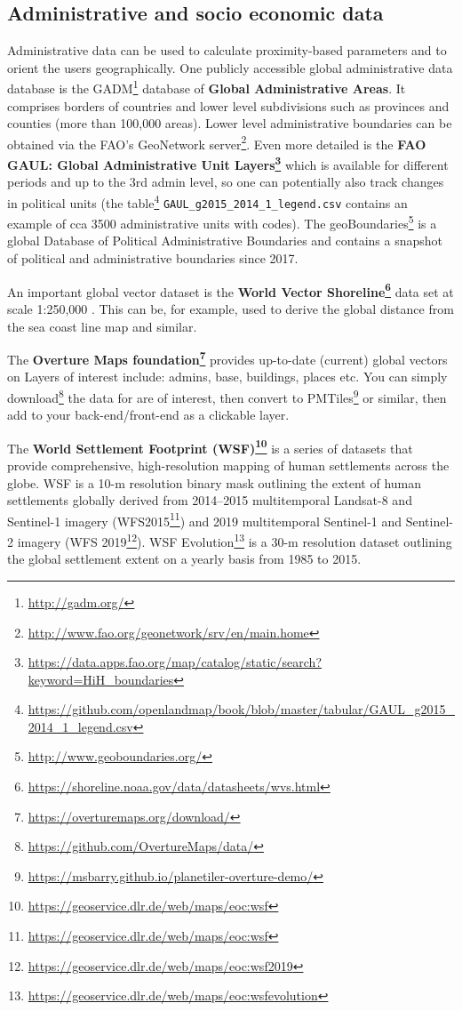 \documentclass[
  graybox,natbib,nospthms]{svmono}
\renewcommand{\href}[2]{#2 (\url{#1})}
\renewcommand{\href}[2]{#2\footnote{\url{#1}}}
\begin{document}
\hypertarget{administrative-and-socio-economic-data}{%
\subsection{Administrative and socio economic data}\label{administrative-and-socio-economic-data}}

Administrative data can be used to calculate proximity-based parameters and to
orient the users geographically. One publicly accessible global administrative
data database is the \href{http://gadm.org/}{GADM} database of \textbf{Global Administrative Areas}.
It comprises borders of countries and lower level subdivisions such as provinces
and counties (more than 100,000 areas). Lower level administrative boundaries can
be obtained via the \href{http://www.fao.org/geonetwork/srv/en/main.home}{FAO's GeoNetwork server}.
Even more detailed is the \textbf{\href{https://data.apps.fao.org/map/catalog/static/search?keyword=HiH_boundaries}{FAO GAUL: Global Administrative Unit Layers}} which is
available for different periods and up to the 3rd admin level, so one can potentially
also track changes in political units (the \href{https://github.com/openlandmap/book/blob/master/tabular/GAUL_g2015_2014_1_legend.csv}{table} \texttt{GAUL\_g2015\_2014\_1\_legend.csv}
contains an example of cca 3500 administrative units with codes). The \href{http://www.geoboundaries.org/}{geoBoundaries}
is a global Database of Political Administrative Boundaries and contains a snapshot
of political and administrative boundaries since 2017.

An important global vector dataset is the \textbf{\href{https://shoreline.noaa.gov/data/datasheets/wvs.html}{World Vector Shoreline}}
data set at scale 1:250,000 \citep{carlotto2017enhancing}. This can be, for example,
used to derive the global distance from the sea coast line map and similar.

The \textbf{\href{https://overturemaps.org/download/}{Overture Maps foundation}} provides up-to-date (current) global vectors on
Layers of interest include: admins, base, buildings, places etc. You can simply \href{https://github.com/OvertureMaps/data/}{download}
the data for are of interest, then convert to \href{https://msbarry.github.io/planetiler-overture-demo/}{PMTiles} or similar, then add to your back-end/front-end as a clickable layer.

The \textbf{\href{https://geoservice.dlr.de/web/maps/eoc:wsf}{World Settlement Footprint (WSF)}} is a series of datasets that provide comprehensive, high-resolution mapping of human settlements across the globe. WSF is a 10-m resolution binary mask outlining the extent of human settlements globally derived from 2014--2015 multitemporal Landsat-8 and Sentinel-1 imagery (\href{https://geoservice.dlr.de/web/maps/eoc:wsf}{WFS2015}) and 2019 multitemporal Sentinel-1 and Sentinel-2 imagery (\href{https://geoservice.dlr.de/web/maps/eoc:wsf2019}{WFS 2019}). \href{https://geoservice.dlr.de/web/maps/eoc:wsfevolution}{WSF Evolution} is a 30-m resolution dataset outlining the global settlement extent on a yearly basis from 1985 to 2015.
\end{document}
